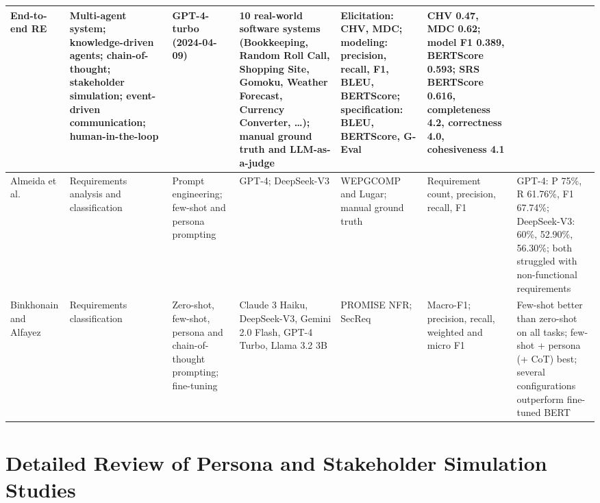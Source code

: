 \begin{appendices}
\begin{landscape}
\begin{longtable}{|p{2.0cm}|p{2.6cm}|p{2.6cm}|p{2.2cm}|p{4.0cm}|p{4.0cm}|p{4.4cm}|}
    End-to-end RE &
    Multi-agent system; knowledge-driven agents; chain-of-thought; stakeholder simulation; event-driven communication; human-in-the-loop &
    GPT-4-turbo (2024-04-09) &
    10 real-world software systems (Bookkeeping, Random Roll Call, Shopping Site, Gomoku, Weather Forecast, Currency Converter, \ldots); manual ground truth and LLM-as-a-judge &
    Elicitation: CHV, MDC; modeling: precision, recall, F1, BLEU, BERTScore; specification: BLEU, BERTScore, G-Eval &
    CHV 0.47, MDC 0.62; model F1 0.389, BERTScore 0.593; SRS BERTScore 0.616, completeness 4.2, correctness 4.0, cohesiveness 4.1 \\
    \hline
    Almeida et al.~\cite{almeida2025elicitation} &
    Requirements analysis and classification &
    Prompt engineering; few-shot and persona prompting &
    GPT-4; DeepSeek-V3 &
    WEPGCOMP and Lugar; manual ground truth &
    Requirement count, precision, recall, F1 &
    GPT-4: P 75\%, R 61.76\%, F1 67.74\%; DeepSeek-V3: 60\%, 52.90\%, 56.30\%; both struggled with non-functional requirements \\
    \hline
    Binkhonain and Alfayez~\cite{binkhonain2025prompts} &
    Requirements classification &
    Zero-shot, few-shot, persona and chain-of-thought prompting; fine-tuning &
    Claude 3 Haiku, DeepSeek-V3, Gemini 2.0 Flash, GPT-4 Turbo, Llama 3.2 3B &
    PROMISE NFR; SecReq &
    Macro-F1; precision, recall, weighted and micro F1 &
    Few-shot better than zero-shot on all tasks; few-shot + persona (+ CoT) best; several configurations outperform fine-tuned BERT \\
    \hline
\end{longtable}
\end{landscape}

\chapter{Detailed Review of Persona and Stakeholder Simulation Studies}
\label{apx:persona-studies}


\end{appendices}
